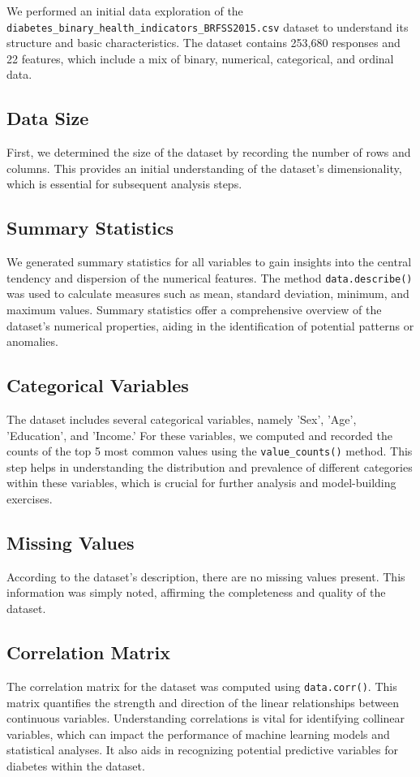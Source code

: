 \documentclass[11pt]{article}
\begin{document}
We performed an initial data exploration of the \texttt{diabetes\_binary\_health\_indicators\_BRFSS2015.csv} dataset to understand its structure and basic characteristics. The dataset contains 253,680 responses and 22 features, which include a mix of binary, numerical, categorical, and ordinal data.

\subsection{Data Size}
First, we determined the size of the dataset by recording the number of rows and columns. This provides an initial understanding of the dataset's dimensionality, which is essential for subsequent analysis steps. 

\subsection{Summary Statistics}
We generated summary statistics for all variables to gain insights into the central tendency and dispersion of the numerical features. The method \texttt{data.describe()} was used to calculate measures such as mean, standard deviation, minimum, and maximum values. Summary statistics offer a comprehensive overview of the dataset's numerical properties, aiding in the identification of potential patterns or anomalies.

\subsection{Categorical Variables}
The dataset includes several categorical variables, namely 'Sex', 'Age', 'Education', and 'Income.' For these variables, we computed and recorded the counts of the top 5 most common values using the \texttt{value\_counts()} method. This step helps in understanding the distribution and prevalence of different categories within these variables, which is crucial for further analysis and model-building exercises.

\subsection{Missing Values}
According to the dataset's description, there are no missing values present. This information was simply noted, affirming the completeness and quality of the dataset.

\subsection{Correlation Matrix}
The correlation matrix for the dataset was computed using \texttt{data.corr()}. This matrix quantifies the strength and direction of the linear relationships between continuous variables. Understanding correlations is vital for identifying collinear variables, which can impact the performance of machine learning models and statistical analyses. It also aids in recognizing potential predictive variables for diabetes within the dataset.
\end{document}
